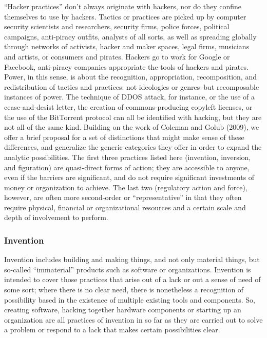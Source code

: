 \documentclass[10pt,letter,oneside]{scrartcl}
\begin{document}
``Hacker practices'' don’t always originate with hackers, nor do they confine
themselves to use by hackers.  Tactics or practices are picked up by computer
security scientists and researchers, security firms, police forces, political
campaigns, anti-piracy outfits, analysts of all sorts, as well as spreading
globally through networks of activists, hacker and maker spaces, legal firms, 
musicians and artists, or consumers and pirates. Hackers go to work for 
Google or Facebook, anti-piracy companies appropriate the tools of hackers 
and pirates.  Power, in this sense, is about the recognition, appropriation, 
recomposition, and redistribution of tactics and practices: not ideologies or 
genres--but recomposable instances of power.  The technique of DDOS attack, 
for instance, or the use of a cease-and-desist letter, the creation of 
commons-producing copyleft licenses, or the use of the BitTorrent protocol 
can all be identified with hacking, but they are not all of the same kind.  
Building on the work of Coleman and Golub (2009), we offer a brief proposal 
for a set of distinctions that might make sense of these differences, and 
generalize the generic categories they offer in order to expand the analytic possibilities.  The first three practices listed here (invention, inversion, 
and figuration) are quasi-direct forms of action; they are accessible to anyone, 
even if the barriers are significant, and do not require significant investments 
of money or organization to achieve.  The last two (regulatory action and 
force), however, are often more second-order or ``representative'' in that 
they often require physical, financial or organizational resources and a 
certain scale and depth of involvement to perform. 



\subsubsection{Invention}

Invention includes building and making things, and not only material things, but
so-called ``immaterial'' products such as software or organizations.  Invention
is intended to cover those practices that arise out of a lack or out a sense of
need of some sort; where there is no clear need, there is nonetheless a
recognition of possibility based in the existence of multiple existing tools and
components.  So, creating software, hacking together hardware components or
starting up an organization are all practices of invention in so far as they are
carried out to solve a problem or respond to a lack that makes certain
possibilities clear.
\end{document}
